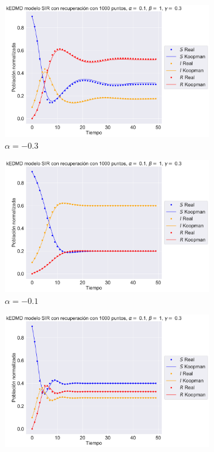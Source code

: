 \begin{figure}[h]
    \centering
    \begin{subfigure}[b]{0.45\textwidth}
        \centering
        \includegraphics[width=\textwidth]{img/content/chapter3/SIR_rec1.pdf}
        \caption{$\alpha=-0.3$}
        \label{fig:image1}
    \end{subfigure}
    \hfill
    \begin{subfigure}[b]{0.45\textwidth}
        \centering
        \includegraphics[width=\textwidth]{img/content/chapter3/SIR_rec2.pdf}
        \caption{$\alpha=-0.1$}
        \label{fig:image2}
    \end{subfigure}
    \hfill
    \begin{subfigure}[b]{0.45\textwidth}
        \centering
        \includegraphics[width=\textwidth]{img/content/chapter3/SIR_rec3.pdf}

\end{subfigure}
\end{figure}
